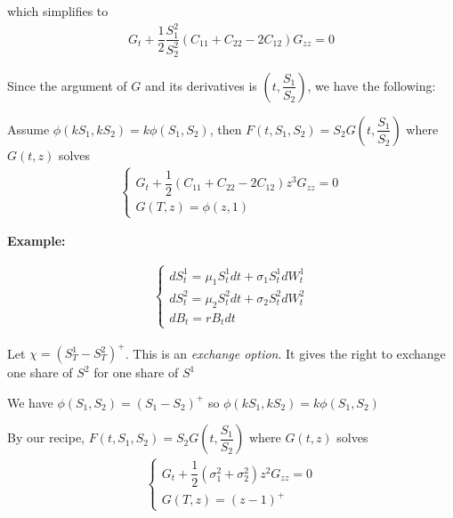 \noindent which simplifies to
\begin{equation*}
  \begin{gathered}
    G_t+\dfrac{1}{2}\dfrac{S_1^2}{S_2^2}\left(C_{11}+C_{22}-2C_{12}\right)G_{zz} = 0
  \end{gathered}
\end{equation*}
\par\bigskip
\noindent Since the argument of $G$ and its derivatives is $\left(t,\dfrac{S_1}{S_2}\right)$, we have the following:
\par\bigskip
\begin{lem}[]{}
  Assume $\phi(kS_1,kS_2) = k\phi(S_1,S_2)$, then $F(t,S_1,S_2) = S_2G\left(t,\dfrac{S_1}{S_2}\right)$ where $G(t,z)$ solves
  \begin{equation*}
    \begin{gathered}
      \begin{cases}
        G_t+\dfrac{1}{2}\left(C_{11}+C_{22}-2C_{12}\right)z^3G_{zz}=0\\
        G(T,z) = \phi(z,1)
      \end{cases}
    \end{gathered}
  \end{equation*}
\end{lem}
\par\bigskip
\noindent\textbf{Example:}\par
\begin{equation*}
  \begin{gathered}
    \begin{cases}
      dS_t^1 = \mu_1S_t^1dt+\sigma_1S_t^1dW_t^1\\
      dS_t^2=\mu_2S_t^2dt+\sigma_2S_t^2dW_t^2\\
      dB_t = rB_tdt
    \end{cases}
  \end{gathered}
\end{equation*}\par
\noindent Let $\chi = \left(S_T^1-S_T^2\right)^+$. This is an \textit{exchange option}. It gives the right to exchange one share of $S^2$ for one share of $S^1$\par
\noindent We have $\phi(S_1,S_2) = (S_1-S_2)^+$ so $\phi(kS_1,kS_2) = k\phi(S_1,S_2)$\par
\noindent By our recipe, $F(t,S_1,S_2) = S_2G\left(t,\dfrac{S_1}{S_2}\right)$ where $G(t,z)$ solves
\begin{equation*}
  \begin{gathered}
    \begin{cases}
      G_t+\dfrac{1}{2}\left(\sigma_1^2+\sigma_2^2\right)z^2G_{zz}=0\\
      G(T,z) = (z-1)^+
    \end{cases}
  \end{gathered}
\end{equation*}\par
